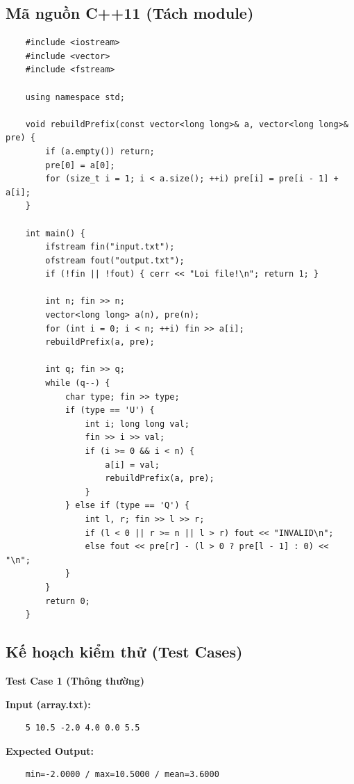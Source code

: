 \subsection{Mã nguồn C++11 (Tách module)}
    \begin{lstlisting}
    #include <iostream>
    #include <vector>
    #include <fstream>

    using namespace std;

    void rebuildPrefix(const vector<long long>& a, vector<long long>& pre) {
        if (a.empty()) return;
        pre[0] = a[0];
        for (size_t i = 1; i < a.size(); ++i) pre[i] = pre[i - 1] + a[i];
    }

    int main() {
        ifstream fin("input.txt");
        ofstream fout("output.txt");
        if (!fin || !fout) { cerr << "Loi file!\n"; return 1; }

        int n; fin >> n;
        vector<long long> a(n), pre(n);
        for (int i = 0; i < n; ++i) fin >> a[i];
        rebuildPrefix(a, pre);

        int q; fin >> q;
        while (q--) {
            char type; fin >> type;
            if (type == 'U') {
                int i; long long val;
                fin >> i >> val;
                if (i >= 0 && i < n) {
                    a[i] = val;
                    rebuildPrefix(a, pre);
                }
            } else if (type == 'Q') {
                int l, r; fin >> l >> r;
                if (l < 0 || r >= n || l > r) fout << "INVALID\n";
                else fout << pre[r] - (l > 0 ? pre[l - 1] : 0) << "\n";
            }
        }
        return 0;
    }
\end{lstlisting}

\subsection{Kế hoạch kiểm thử (Test Cases)}

    \textbf{Test Case 1 (Thông thường)}

    \textbf{Input (array.txt):}
    \begin{lstlisting}
    5 10.5 -2.0 4.0 0.0 5.5\end{lstlisting}

    \textbf{Expected Output:}
    \begin{lstlisting}
    min=-2.0000 / max=10.5000 / mean=3.6000\end{lstlisting}

    \vspace{0.5cm}

